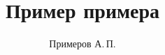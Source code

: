 \documentclass{mipt-thesis-bs}
\title{Пример примера}
\author{Примеров А.\,П.}
\begin{document}
    \frontmatter
    \titlecontents
\end{document}
